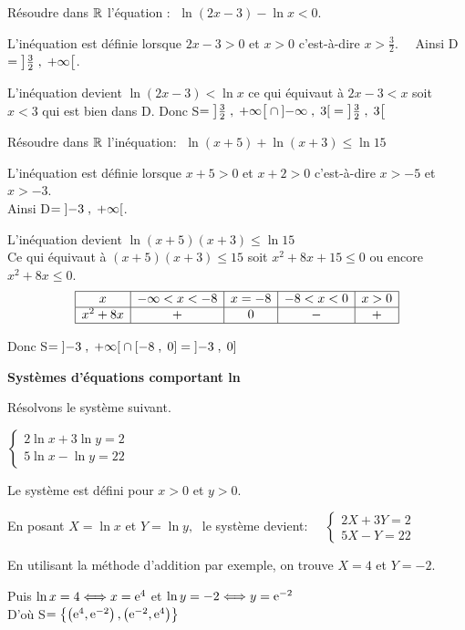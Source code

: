 \begin{example} Résoudre dans $ \mathbb{R} $ l'équation : $\; \ln (2x-3)-\ln x< 0 $.

L'inéquation est définie lorsque $2x-3>0$ et $ x>0$  c'est-à-dire $ x>\frac{3}{2}.\quad $ Ainsi D$ =\left]\frac{3}{2} \;,\; +\infty\right[ $.

L'inéquation devient  $ \ln (2x-3)<\ln x$  ce qui équivaut à $ 2x-3<x $  soit $ x<3 $ qui est bien dans D. Donc S$ =\left]\frac{3}{2} \;,\; +\infty\right[\cap \left]-\infty \;,\; 3\right[= \left]\frac{3}{2} \;,\; 3\right[$
\end{example}
\begin{example} Résoudre dans $ \mathbb{R} $ l'inéquation: $\; \ln (x+5)+\ln (x+3)\leq\ln 15  $


L'inéquation est définie lorsque $x+5>0$ et $ x+2>0$  c'est-à-dire $ x>-5 $  et $ x>-3 $.\\  Ainsi D$ =\left]-3 \;,\; +\infty\right[ $.

L'inéquation devient  $ \ln (x+5)(x+3)\leq\ln 15$ \\Ce qui équivaut à $ (x+5)(x+3)\leq 15 $  soit $ x^{2}+8x+15\leq 0 $  ou encore $ x^{2}+8x\leq 0 $. 
 \[
\begin{array}{|c|c|c|c|c|}
\hline
x & -\infty < x < -8 & x = -8 & -8 < x < 0 & x > 0 \\
\hline
x^{2} + 8x & + & 0 & - & + \\
\hline
\end{array}
\]

  
 Donc S$ = \left]-3 \;,\; +\infty\right[\cap\left[-8\;,\; 0\right]=\left]-3 \;, \;0\right]$
\end{example}
\textbf{Systèmes d'équations comportant ln}
\begin{example}
Résolvons le système suivant.

\medskip

$  \left\{\begin{array}{l} 2\ln x+3\ln y=2 \\ 5\ln x-\ln y=22\end{array}\right.$

Le système est défini pour $x>0 $ et $y>0 $.

\medskip
En posant $X=\ln x  $ et $Y=\ln y,\; $  le système devient:
   $ \quad \left\{\begin{array}{l} 2X+3Y=2 \\ 5X-Y=22\end{array}\right.$

\medskip

En utilisant la méthode d'addition par exemple, on trouve $X=4 $ et $Y=-2 $.

\medskip
Puis $\ln x=4 \Longleftrightarrow  x=\mathrm{e}^{4} $  et $\ln y=-2 \Longleftrightarrow  y=\mathrm{e}^{-2} $ \\

D'où S$ =\left\{\left(\mathrm{e}^{4},\mathrm{e}^{-2}\right),\left(\mathrm{e}^{-2},\mathrm{e}^{4}\right)\right\} $

\end{example}
